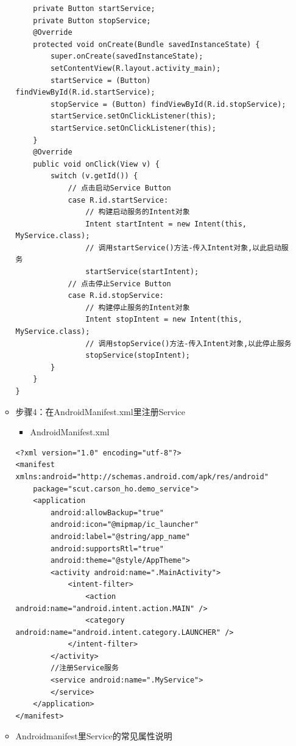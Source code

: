 \documentclass[9pt, b5paper]{article}
\begin{document}
\begin{enumerate}
\begin{itemize}
\begin{verbatim}
    private Button startService;
    private Button stopService;
    @Override
    protected void onCreate(Bundle savedInstanceState) {
        super.onCreate(savedInstanceState);
        setContentView(R.layout.activity_main);
        startService = (Button) findViewById(R.id.startService);
        stopService = (Button) findViewById(R.id.stopService);
        startService.setOnClickListener(this);
        startService.setOnClickListener(this);
    }
    @Override
    public void onClick(View v) {
        switch (v.getId()) {
            // 点击启动Service Button
            case R.id.startService:
                // 构建启动服务的Intent对象
                Intent startIntent = new Intent(this, MyService.class);
                // 调用startService()方法-传入Intent对象,以此启动服务
                startService(startIntent);
            // 点击停止Service Button
            case R.id.stopService:
                // 构建停止服务的Intent对象
                Intent stopIntent = new Intent(this, MyService.class);
                // 调用stopService()方法-传入Intent对象,以此停止服务
                stopService(stopIntent);
        }
    }
}
\end{verbatim}
\item 步骤4：在AndroidManifest.xml里注册Service
\begin{itemize}
\item AndroidManifest.xml
\end{itemize}
\begin{verbatim}
<?xml version="1.0" encoding="utf-8"?>
<manifest xmlns:android="http://schemas.android.com/apk/res/android"
    package="scut.carson_ho.demo_service">
    <application
        android:allowBackup="true"
        android:icon="@mipmap/ic_launcher"
        android:label="@string/app_name"
        android:supportsRtl="true"
        android:theme="@style/AppTheme">
        <activity android:name=".MainActivity">
            <intent-filter>
                <action android:name="android.intent.action.MAIN" />
                <category android:name="android.intent.category.LAUNCHER" />
            </intent-filter>
        </activity>
        //注册Service服务
        <service android:name=".MyService">
        </service>
    </application>
</manifest>
\end{verbatim}
\item Androidmanifest里Service的常见属性说明
\end{itemize}
\begin{center}
\begin{tabular}{lll}

\end{tabular}
\end{center}
\end{enumerate}
\end{document}
